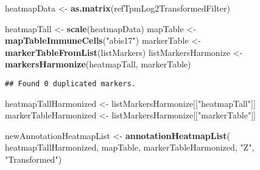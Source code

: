 \documentclass[
]{article}
\newenvironment{Shaded}{\begin{snugshade}}{\end{snugshade}}
\newcommand{\FunctionTok}[1]{\textcolor[rgb]{0.13,0.29,0.53}{\textbf{#1}}}
\newcommand{\NormalTok}[1]{#1}
\newcommand{\OtherTok}[1]{\textcolor[rgb]{0.56,0.35,0.01}{#1}}
\newcommand{\SpecialCharTok}[1]{\textcolor[rgb]{0.81,0.36,0.00}{\textbf{#1}}}
\newcommand{\StringTok}[1]{\textcolor[rgb]{0.31,0.60,0.02}{#1}}
\begin{document}
\begin{Shaded}
\begin{Highlighting}[]
\NormalTok{heatmapData }\OtherTok{\textless{}{-}} \FunctionTok{as.matrix}\NormalTok{(refTpmLog2TransformedFilter)}
\end{Highlighting}
\end{Shaded}

\begin{Shaded}
\begin{Highlighting}[]
\NormalTok{heatmapTall }\OtherTok{\textless{}{-}} \FunctionTok{scale}\NormalTok{(heatmapData)}
\NormalTok{mapTable }\OtherTok{\textless{}{-}} \FunctionTok{mapTableImmuneCells}\NormalTok{(}\StringTok{"abis17"}\NormalTok{)}
\NormalTok{markerTable }\OtherTok{\textless{}{-}} \FunctionTok{markerTableFromList}\NormalTok{(listMarkers)}
\NormalTok{listMarkersHarmonize }\OtherTok{\textless{}{-}} \FunctionTok{markersHarmonize}\NormalTok{(heatmapTall, markerTable)}
\end{Highlighting}
\end{Shaded}

\begin{verbatim}
## Found 0 duplicated markers.
\end{verbatim}

\begin{Shaded}
\begin{Highlighting}[]
\NormalTok{heatmapTallHarmonized }\OtherTok{\textless{}{-}}\NormalTok{ listMarkersHarmonize[[}\StringTok{"heatmapTall"}\NormalTok{]]}
\NormalTok{markerTableHarmonized }\OtherTok{\textless{}{-}}\NormalTok{ listMarkersHarmonize[[}\StringTok{"markerTable"}\NormalTok{]]}
\end{Highlighting}
\end{Shaded}

\begin{Shaded}
\begin{Highlighting}[]
\NormalTok{newAnnotationHeatmapList }\OtherTok{\textless{}{-}} \FunctionTok{annotationHeatmapList}\NormalTok{(}
\NormalTok{  heatmapTallHarmonized, mapTable, markerTableHarmonized, }\StringTok{"Z"}\NormalTok{, }\StringTok{"Transformed"}\NormalTok{)}
\end{Highlighting}
\end{Shaded}

\begin{Shaded}
\end{Shaded}
\end{document}
